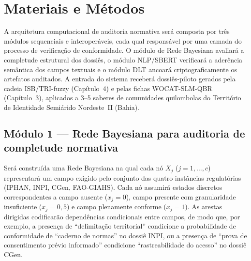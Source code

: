 \section{Materiais e Métodos}

A arquitetura computacional de auditoria normativa será composta por três módulos sequenciais e interoperáveis, cada qual responsável por uma camada do processo de verificação de conformidade. O módulo de Rede Bayesiana avaliará a completude estrutural dos dossiês, o módulo NLP/SBERT verificará a aderência semântica dos campos textuais e o módulo DLT ancoará criptograficamente os artefatos auditados. A entrada do sistema receberá dossiês-piloto gerados pela cadeia ISB/TRI-fuzzy (Capítulo~4) e pelas fichas WOCAT-SLM-QBR (Capítulo~3), aplicados a 3--5 saberes de comunidades quilombolas do Território de Identidade Semiárido Nordeste~II (Bahia).

\subsection{Módulo 1 --- Rede Bayesiana para auditoria de completude normativa}
\label{subsec:bayesnet_cap5}

Será construída uma Rede Bayesiana na qual cada nó $X_j$ ($j = 1, \ldots, c$) representará um campo exigido pelo conjunto das quatro instâncias regulatórias (IPHAN, INPI, CGen, FAO-GIAHS). Cada nó assumirá estados discretos correspondentes a campo ausente ($x_j = 0$), campo presente com granularidade insuficiente ($x_j = 0{,}5$) e campo plenamente conforme ($x_j = 1$). As arestas dirigidas codificarão dependências condicionais entre campos, de modo que, por exemplo, a presença de ``delimitação territorial'' condicione a probabilidade de conformidade de ``caderno de normas'' no dossiê INPI, ou a presença de ``prova de consentimento prévio informado'' condicione ``rastreabilidade do acesso'' no dossiê CGen.


